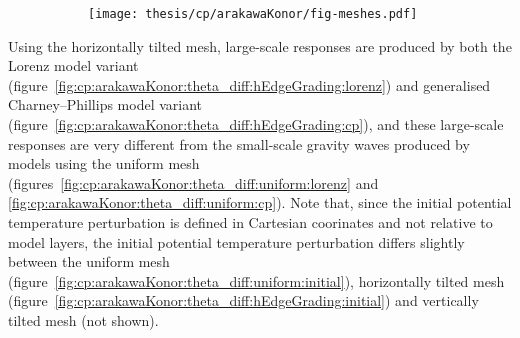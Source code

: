 \begin{figure}
	\centering
	\begin{subfigure}{\textwidth}
		\label{fig:cp:arakawaKonor:edgeGradedMesh:h}
		\label{fig:cp:arakawaKonor:edgeGradedMesh:v}
		\texttt{[image: thesis/cp/arakawaKonor/fig-meshes.pdf]}
	\end{subfigure}
%
	\caption{}
	\label{fig:cp:arakawaKonor:edgeGradedMesh}
\end{figure}


Using the horizontally tilted mesh, large-scale responses are produced by both the Lorenz model variant (figure~\ref{fig:cp:arakawaKonor:theta_diff:hEdgeGrading:lorenz}) and generalised Charney--Phillips model variant (figure~\ref{fig:cp:arakawaKonor:theta_diff:hEdgeGrading:cp}), and these large-scale responses are very different from the small-scale gravity waves produced by models using the uniform mesh (figures~\ref{fig:cp:arakawaKonor:theta_diff:uniform:lorenz} and \ref{fig:cp:arakawaKonor:theta_diff:uniform:cp}).
Note that, since the initial potential temperature perturbation is defined in Cartesian coorinates and not relative to model layers, the initial potential temperature perturbation differs slightly between the uniform mesh (figure~\ref{fig:cp:arakawaKonor:theta_diff:uniform:initial}), horizontally tilted mesh (figure~\ref{fig:cp:arakawaKonor:theta_diff:hEdgeGrading:initial}) and vertically tilted mesh (not shown).  
